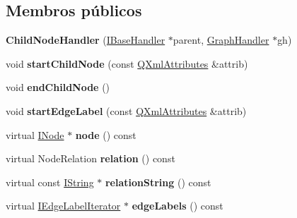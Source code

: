 \subsection*{Membros públicos}
\begin{DoxyCompactItemize}
\item 
\hypertarget{class_child_node_handler_a3d5a6c5b130ca18f4d76a410b6dcc25a}{{\bfseries Child\-Node\-Handler} (\hyperlink{class_i_base_handler}{I\-Base\-Handler} $\ast$parent, \hyperlink{class_graph_handler}{Graph\-Handler} $\ast$gh)}\label{class_child_node_handler_a3d5a6c5b130ca18f4d76a410b6dcc25a}

\item 
\hypertarget{class_child_node_handler_a4387c021769bc2f0b08580eff7f6dc28}{void {\bfseries start\-Child\-Node} (const \hyperlink{class_q_xml_attributes}{Q\-Xml\-Attributes} \&attrib)}\label{class_child_node_handler_a4387c021769bc2f0b08580eff7f6dc28}

\item 
\hypertarget{class_child_node_handler_a4a1f286e5a73a777f2f381978857ecc4}{void {\bfseries end\-Child\-Node} ()}\label{class_child_node_handler_a4a1f286e5a73a777f2f381978857ecc4}

\item 
\hypertarget{class_child_node_handler_a9f087a53fd7db00c162608d0e76ee37d}{void {\bfseries start\-Edge\-Label} (const \hyperlink{class_q_xml_attributes}{Q\-Xml\-Attributes} \&attrib)}\label{class_child_node_handler_a9f087a53fd7db00c162608d0e76ee37d}

\item 
\hypertarget{class_child_node_handler_ad38b7d6894a18d8e1ce58c7e768009ef}{virtual \hyperlink{class_i_node}{I\-Node} $\ast$ {\bfseries node} () const }\label{class_child_node_handler_ad38b7d6894a18d8e1ce58c7e768009ef}

\item 
\hypertarget{class_child_node_handler_ab589e4767fe32492a57dc64e3fb1164b}{virtual Node\-Relation {\bfseries relation} () const }\label{class_child_node_handler_ab589e4767fe32492a57dc64e3fb1164b}

\item 
\hypertarget{class_child_node_handler_aeb87387f72da01955ee473b886744f7d}{virtual const \hyperlink{class_i_string}{I\-String} $\ast$ {\bfseries relation\-String} () const }\label{class_child_node_handler_aeb87387f72da01955ee473b886744f7d}

\item 
\hypertarget{class_child_node_handler_a05733a5ca02ddb20ee4d1075588a5506}{virtual \hyperlink{class_i_edge_label_iterator}{I\-Edge\-Label\-Iterator} $\ast$ {\bfseries edge\-Labels} () const }\label{class_child_node_handler_a05733a5ca02ddb20ee4d1075588a5506}

\end{DoxyCompactItemize}
